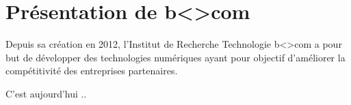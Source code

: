 \chapter{Présentation de b<>com}

\par
Depuis sa création en 2012, l'Institut de Recherche Technologie b<>com a pour but de développer des technologies numériques ayant pour objectif d'améliorer la compétitivité des entreprises partenaires.

\par
C'est aujourd'hui ..